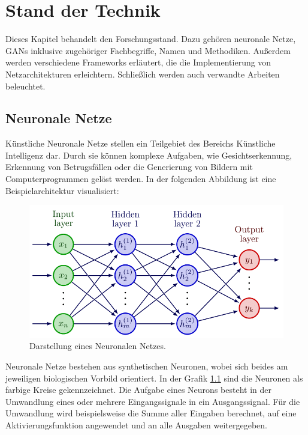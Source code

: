 
\chapter{Stand der Technik}
Dieses Kapitel behandelt den Forschungsstand.
Dazu gehören neuronale Netze, GANs inklusive zugehöriger Fachbegriffe, Namen und Methodiken.
Außerdem werden verschiedene Frameworks erläutert, die die Implementierung von Netzarchitekturen erleichtern.
Schließlich werden auch verwandte Arbeiten beleuchtet.

\section{Neuronale Netze}
Künstliche Neuronale Netze stellen ein Teilgebiet des Bereichs Künstliche Intelligenz dar.
Durch sie können komplexe Aufgaben, wie Gesichtserkennung, Erkennung von Betrugsfällen oder die Generierung von Bildern mit Computerprogrammen gelöst werden.
In der folgenden Abbildung ist eine Beispielarchitektur visualisiert:

\begin{figure}[H]
	\centering
	\includegraphics[width=12cm]{kapitel/2_stand_der_technik/img/neural-network.png}
	\caption[Darstellung eines Neuronalen Netzes]{Darstellung eines Neuronalen Netzes.}
	\label{img:neural-networks}
\end{figure}

Neuronale Netze bestehen aus synthetischen Neuronen, wobei sich beides am jeweiligen biologischen Vorbild orientiert.
In der Grafik \cref{img:neural-networks} sind die Neuronen als farbige Kreise gekennzeichnet.
Die Aufgabe eines Neurons besteht in der Umwandlung eines oder mehrere Eingangssignale in ein Ausgangssignal.
Für die Umwandlung wird beispielsweise die Summe aller Eingaben berechnet, auf eine Aktivierungsfunktion angewendet und an alle Ausgaben weitergegeben.
\newline

